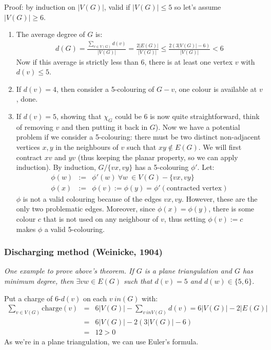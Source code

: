 \documentclass[11pt]{book}
\begin{document}
		Proof: by induction on $|V(G)|$, valid if $|V(G)| \leq 5$ so let's assume $|V(G)| \geq 6$. 
		\begin{enumerate}
			\item The average degree of $G$ is:
				\begin{eqnarray}
					d(G) = \frac{\sum_{v \in V(G)} d(v)}{|V(G)|} = \frac{2 |E(G)|}{|V(G)|} \leq \frac{2 (3|V(G)| - 6)}{|V(G)|} < 6
				\end{eqnarray}
				Now if this average is strictly less than 6, there is at least one vertex $v$ with $d(v) \leq 5$.
			\item If $d(v) = 4$, then consider a 5-colouring of $G-v$, one colour is available at $v$, done.
			\item If $d(v) = 5$, showing that $\chi_{G}$ could be 6 is now quite straightforward, think of removing $v$ and then putting it back in $G$). Now we have a potential problem if we consider a 5-colouring: there must be two distinct non-adjacent vertices $x, y$ in the neighbours of $v$ such that $xy \notin E(G)$. We will first contract $xv$ and $yv$ (thus keeping the planar property, so we can apply induction). By induction, $G / \{ vx, vy \}$ has a 5-colouring $\phi'$. Let:
				\begin{eqnarray}
					\phi(w) &:=& \phi'(w) ~\forall w\ \in V(G) - \{ vx, vy \}\\
					\phi(x) &:=& \phi(v) := \phi(y) = \phi'(\text{contracted vertex})
				\end{eqnarray}
				$\phi$ is not a valid colouring because of the edges $vx, vy$. However, these are the only two problematic edges. Moreover, since $\phi(x) = \phi(y)$, there is some colour $c$ that is not used on any neighbour of $v$, thus setting $\phi(v) := c$ makes $\phi$ a valid 5-colouring.
		\end{enumerate}
		
		
		\subsubsection{Discharging method (Weinicke, 1904)}
		\textit{One example to prove above's theorem. If $G$ is a plane triangulation and $G$ has minimum degree, then $\exists vw \in E(G)$ such that $d(v) = 5$ and $d(w) \in \{ 5, 6 \}$.\\}
		
		Put a charge of 6-$d(v)$ on each $v \ in (G)$ with:
		\begin{eqnarray}
			\sum_{v \in V(G)} \text{charge}(v) &=& 6 |V(G)| - \sum_{v \ in V(G)} d(v) = 6 |V(G)| - 2 |E(G)|\\
			&=& 6 |V(G)| - 2 (3|V(G)| - 6) \\
			&=& 12 > 0
		\end{eqnarray}
		As we're in a plane triangulation, we can use Euler's formula.\\
		
\end{document}
